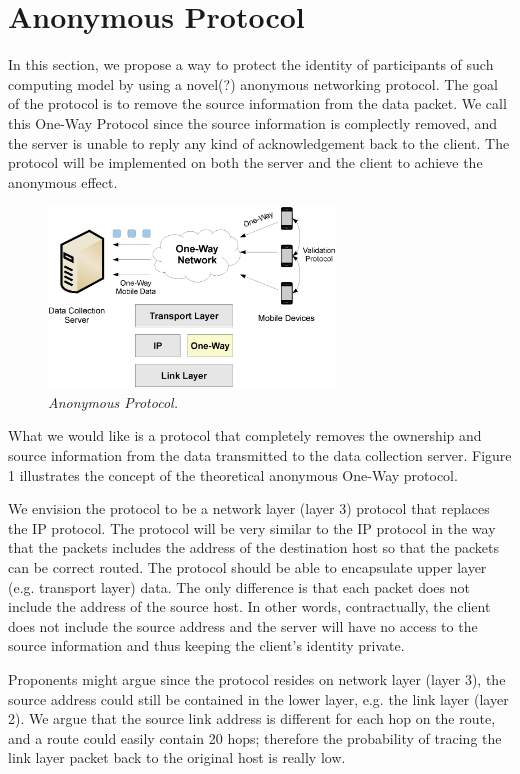 \section{Anonymous Protocol}\label{sec-protocol}

In this section, we propose a way to protect the identity of participants
of such computing model by using a novel(?) anonymous networking protocol.
The goal of the protocol is to remove the source information from the data
packet. We call this One-Way Protocol since the source information is
complectly removed, and the server is unable to reply any kind of
acknowledgement back to the client. The protocol will be implemented on
both the server and the client to achieve the anonymous effect.

\begin{figure}[h]
\begin{center}
\includegraphics[width=3in]{figure1.eps}
\caption{\small \sl Anonymous Protocol.\label{fig:Stupendous}}
\end{center}
\end{figure}

What we would like is a protocol that completely removes the ownership and
source information from the data transmitted to the data collection server.
Figure 1 illustrates the concept of the theoretical anonymous One-Way
protocol.

We envision the protocol to be a network layer (layer 3) protocol that
replaces the IP protocol. The protocol will be very similar to the IP protocol
in the way that the packets includes the address of the destination host so
that the packets can be correct routed. The protocol should be able to
encapsulate upper layer (e.g. transport layer) data. The only difference is
that each packet does not include the address of the source host. In other
words, contractually, the client does not include the source address and the
server will have no access to the source information and thus keeping the
client's identity private.

Proponents might argue since the protocol resides on network layer (layer 3),
the source address could still be contained in the lower layer, e.g. the link
layer (layer 2). We argue that the source link address is different for
each hop on the route, and a route could easily contain 20 hops; therefore
the probability of tracing the link layer packet back to the original host is
really low.

